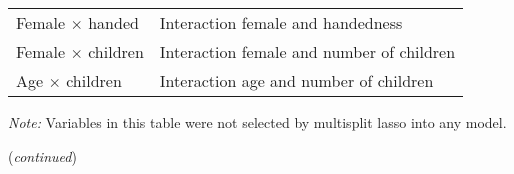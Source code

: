 \documentclass[a4paper,12pt]{article}
\begin{document}
{\begin{threeparttable}
\begin{small}
\begin{tabular}{ll}
\vspace{0.14cm}Female $\times$ handed &Interaction female and handedness\\
\vspace{0.14cm}Female $\times$ children &Interaction female and number of children\\
\vspace{0.14cm}Age $\times$ children &Interaction age and number of children\\
\hline
\hline
\end{tabular} 
\end{small}
 \begin{tablenotes}
  \begin{footnotesize}
     \item[~]\textit{Note:} \vspace{-0.35cm} Variables in this table were not selected by multisplit lasso into any model.
      \\    \item[~]\hfill (\textit{continued})
\singlespacing
  \end{footnotesize}
   \end{tablenotes}
  \end{threeparttable} 
\par}







\end{document}

